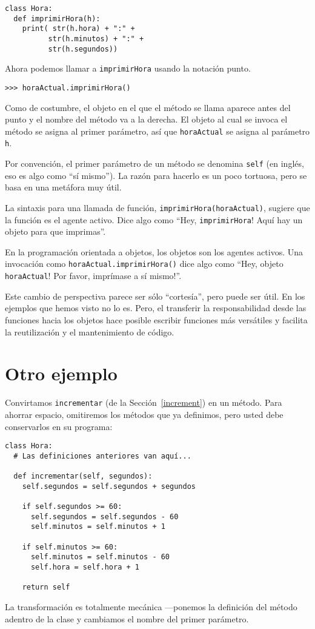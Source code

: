 \begin{verbatim}
class Hora:
  def imprimirHora(h):
    print( str(h.hora) + ":" + 
          str(h.minutos) + ":" + 
          str(h.segundos))
\end{verbatim}
 Ahora podemos llamar a \texttt{imprimirHora} usando la notación punto.

\begin{verbatim}
>>> horaActual.imprimirHora()
\end{verbatim}

Como de costumbre, el objeto en el que el método se llama aparece
antes del punto y el nombre del método va a la derecha. El objeto
al cual se invoca el método se asigna al primer parámetro, así que
\texttt{horaActual} se asigna al parámetro \texttt{h}.

Por convención, el primer parámetro de un método se denomina \texttt{self}
(en inglés, eso es algo como ``sí mismo''). La razón para hacerlo
es un poco tortuosa, pero se basa en una metáfora muy útil.

La sintaxis para una llamada de función, \texttt{imprimirHora(horaActual)},
sugiere que la función es el agente activo. Dice algo como ``Hey,
\texttt{imprimirHora}! Aquí hay un objeto para que imprimas''.

En la programación orientada a objetos, los objetos son los agentes
activos. Una invocación como \texttt{horaActual.imprimirHora()} dice
algo como ``Hey, objeto \texttt{horaActual}! Por favor, imprímase
a sí mismo!''.

Este cambio de perspectiva parece ser sólo ``cortesía'', pero puede
ser útil. En los ejemplos que hemos visto no lo es. Pero, el transferir
la responsabilidad desde las funciones hacia los objetos hace posible
escribir funciones más versátiles y facilita la reutilización y el
mantenimiento de código.

\section{Otro ejemplo}

Convirtamos \texttt{incrementar} (de la Sección~\ref{increment})
en un método. Para ahorrar espacio, omitiremos los métodos que ya
definimos, pero usted debe conservarlos en su programa:
\begin{verbatim}
class Hora:
  # Las definiciones anteriores van aquí...
  
  def incrementar(self, segundos):
    self.segundos = self.segundos + segundos

    if self.segundos >= 60:
      self.segundos = self.segundos - 60
      self.minutos = self.minutos + 1

    if self.minutos >= 60:
      self.minutos = self.minutos - 60
      self.hora = self.hora + 1

    return self
\end{verbatim}
 La transformación es totalmente mecánica —ponemos la definición del
método adentro de la clase y cambiamos el nombre del primer parámetro.

